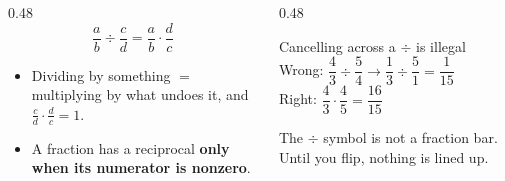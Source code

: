 \documentclass[aspectratio=169, 11pt]{beamer}
\begin{document}
\begin{frame}[t, plain]
  \begin{columns}[T]
    \begin{column}{0.48\textwidth}
      \[ \frac{a}{b}\div\frac{c}{d}=\frac{a}{b}\cdot\frac{d}{c} \]
      \begin{itemize}\setlength{\itemsep}{4pt}
        \item Dividing by something $=$ multiplying by what undoes it, and
              $\frac{c}{d}\cdot\frac{d}{c}=1$.
        \item A fraction has a reciprocal \textbf{only when its numerator is nonzero}.
      \end{itemize}
    \end{column}
    \begin{column}{0.48\textwidth}
      \begin{block}{Cancelling across a $\div$ is illegal}
        Wrong: $\dfrac{4}{3}\div\dfrac{5}{4}\to\dfrac{1}{3}\div\dfrac{5}{1}=\dfrac{1}{15}$ \\[3pt]
        Right: $\dfrac{4}{3}\cdot\dfrac{4}{5}=\dfrac{16}{15}$
      \end{block}
      \vspace{3pt}
      {\footnotesize The $\div$ symbol is not a fraction bar. Until you flip, nothing is lined up.}
    \end{column}
  \end{columns}
\end{frame}
\end{document}
